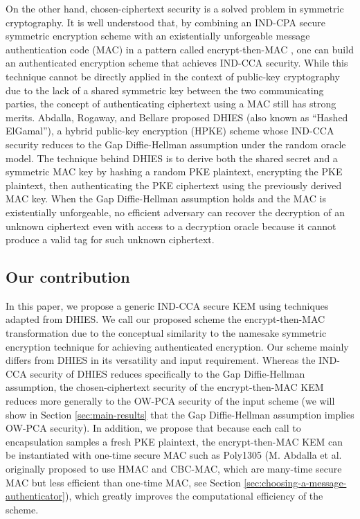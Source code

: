 \documentclass[journal=tches,submission]{iacrtrans}
\begin{document}
On the other hand, chosen-ciphertext security is a solved problem in symmetric cryptography. It is well understood that, by combining an IND-CPA secure symmetric encryption scheme with an existentially unforgeable message authentication code (MAC) in a pattern called encrypt-then-MAC \cite{DBLP:conf/crypto/Krawczyk01}, one can build an authenticated encryption scheme \cite{DBLP:conf/asiacrypt/BellareN00} that achieves IND-CCA security. While this technique cannot be directly applied in the context of public-key cryptography due to the lack of a shared symmetric key between the two communicating parties, the concept of authenticating ciphertext using a MAC still has strong merits. Abdalla, Rogaway, and Bellare proposed DHIES (also known as ``Hashed ElGamal'')\cite{DBLP:journals/iacr/AbdallaBR99}\cite{DBLP:conf/ctrsa/AbdallaBR01}, a hybrid public-key encryption (HPKE) scheme whose IND-CCA security reduces to the Gap Diffie-Hellman assumption \cite{DBLP:conf/pkc/OkamotoP01} under the random oracle model. The technique behind DHIES is to derive both the shared secret and a symmetric MAC key by hashing a random PKE plaintext, encrypting the PKE plaintext, then authenticating the PKE ciphertext using the previously derived MAC key. When the Gap Diffie-Hellman assumption holds and the MAC is existentially unforgeable, no efficient adversary can recover the decryption of an unknown ciphertext even with access to a decryption oracle because it cannot produce a valid tag for such unknown ciphertext.

\subsection{Our contribution}
In this paper, we propose a generic IND-CCA secure KEM using techniques adapted from DHIES. We call our proposed scheme the encrypt-then-MAC transformation due to the conceptual similarity to the namesake symmetric encryption technique for achieving authenticated encryption. Our scheme mainly differs from DHIES in its versatility and input requirement. Whereas the IND-CCA security of DHIES reduces specifically to the Gap Diffie-Hellman assumption, the chosen-ciphertext security of the encrypt-then-MAC KEM reduces more generally to the OW-PCA security \cite{DBLP:conf/ctrsa/OkamotoP01} of the input scheme (we will show in Section \ref{sec:main-results} that the Gap Diffie-Hellman assumption implies OW-PCA security). In addition, we propose that because each call to encapsulation samples a fresh PKE plaintext, the encrypt-then-MAC KEM can be instantiated with one-time secure MAC such as Poly1305 (M. Abdalla et al. originally proposed to use HMAC and CBC-MAC, which are many-time secure MAC but less efficient than one-time MAC, see Section \ref{sec:choosing-a-message-authenticator}), which greatly improves the computational efficiency of the scheme.
\end{document}
